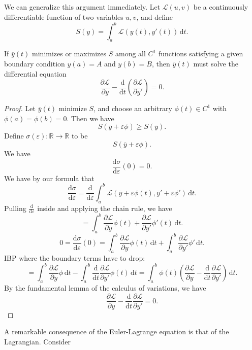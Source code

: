We can generalize this argument immediately. Let $\mathcal{L} (u,v)$ be a continuously differentiable function of two variables $u,v$, and define
\[
	S(y)=\int_{a}^{b} \mathcal{L} (y(t),y'(t)) \,\mathrm{d} t
.\]
\begin{proposition}
	If $\overline{y} (t)$ minimizes or maximizes $S$ among all $C^1$ functions satisfying a given boundary condition $y(a)=A$ and $y(b)=B$, then $\overline{y} (t)$ must solve the differential equation
	\[
		\frac{\partial \mathcal{L}  }{\partial y} -\frac{\mathrm{d}}{\mathrm{d}t} \left( \frac{\partial \mathcal{L} }{\partial y'}  \right) =0
	.\]
\end{proposition}
\begin{proof}
	Let $\overline{y} (t)$ minimize $S$, and choose an arbitrary $\phi  (t)\in C^1$ with $\phi (a)=\phi (b)=0$. Then we have
	\[
		S (\overline{y} +\varepsilon \phi )\geq S(\overline{y} )
	.\]
	Define $\sigma (\varepsilon ): \mathbb{R} \to \mathbb{R}$ to be
	\[
		S(\overline{y} +\varepsilon \phi )
	.\]
	We have
	\[
		\frac{\mathrm{d}\sigma }{\mathrm{d}\varepsilon }(0) =0
	.\]
	We have by our formula that
	\[
		\frac{\mathrm{d}\sigma }{\mathrm{d}\varepsilon } =\frac{\mathrm{d}}{\mathrm{d}\varepsilon } \int_{a}^{b} \mathcal{L} (\overline{y} +\varepsilon \phi (t),\overline{y}'+\varepsilon \phi') \,\mathrm{d} t
	.\]
	Pulling $\frac{\mathrm{d}}{\mathrm{d}\varepsilon } $ inside and applying the chain rule, we have
	\[
		=\int_{a}^{b} \frac{\partial \mathcal{L} }{\partial \overline{y} } \phi (t)+ \frac{\partial \mathcal{L} }{\partial \overline{y}'}\phi' (t)   \,\mathrm{d} t
	.\]
	\[
		0=\frac{\mathrm{d}\sigma }{\mathrm{d}\varepsilon } (0)=\int_{a}^{b} \frac{\partial \mathcal{L} }{\partial y} \phi (t) \,\mathrm{d} t+\int_{a}^{b} \frac{\partial \mathcal{L} }{\partial y'} \phi ' \,\mathrm{d} t
	.\]
	IBP where the boundary terms have to drop:
	\[
		=\int_{a}^{b} \frac{\partial \mathcal{L} }{\partial y} \phi  \,\mathrm{d} t-\int_{a}^{b} \frac{\mathrm{d}}{\mathrm{d}t} \frac{\partial \mathcal{L} }{\partial y'} \phi (t) \,\mathrm{d} t=\int_{a}^{b} \phi (t)\left(\frac{\partial \mathcal{L} }{\partial y} -\frac{\mathrm{d}}{\mathrm{d}t} \frac{\partial \mathcal{L} }{\partial y'}  \right)\,\mathrm{d} t
	.\]
	By the fundamental lemma of the calculus of variations, we have
	\[
		\frac{\partial \mathcal{L} }{\partial y} -\frac{\mathrm{d}}{\mathrm{d}t} \frac{\partial \mathcal{L} }{\partial y'} =0
	.\]
	
\end{proof}
A remarkable consequence of the Euler-Lagrange equation is that of the Lagrangian. Consider
